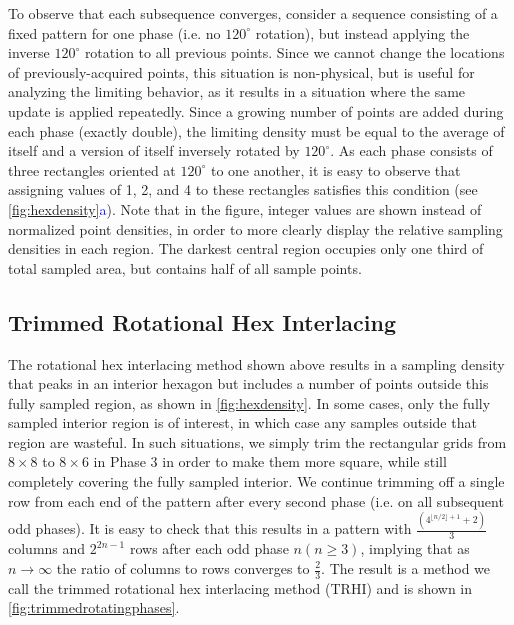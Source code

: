 \documentclass[aip, amsmath, amssymb, nobibnotes, nofootinbib, citeautoscript, reprint, superscriptaddress]{revtex4-2}
\newcommand*{\blu}{\textcolor{blue}}
\begin{document}
    To observe that each subsequence converges, consider a sequence consisting of a fixed pattern for one phase (i.e. no $120^{\circ}$ rotation), but instead applying the inverse $120^{\circ}$ rotation to all previous points.
    Since we cannot change the locations of previously-acquired points, this situation is non-physical, but is useful for analyzing the limiting behavior, as it results in a situation where the same update is applied repeatedly.
    Since a growing number of points are added during each phase (exactly double), the limiting density must be equal to the average of itself and a version of itself inversely rotated by $120^{\circ}$.
    As each phase consists of three rectangles oriented at $120^{\circ}$ to one another, it is easy to observe that assigning values of 1, 2, and 4 to these rectangles satisfies this condition (see \autoref{fig:hexdensity}\blu{a}).
    Note that in the figure, integer values are shown instead of normalized point densities, in order to more clearly display the relative sampling densities in each region.
    The darkest central region occupies only one third of total sampled area, but contains half of all sample points.

    \subsection{\label{ssec:trimmed}Trimmed Rotational Hex Interlacing}

    The rotational hex interlacing method shown above results in a sampling density that peaks in an interior hexagon but includes a number of points outside this fully sampled region, as shown in \autoref{fig:hexdensity}.
    In some cases, only the fully sampled interior region is of interest, in which case any samples outside that region are wasteful.
    In such situations, we simply trim the rectangular grids from $8\times 8$ to $8\times 6$ in
    Phase 3 in order to make them more square, while still completely covering the fully sampled interior.
    We continue trimming off a single row from each end of the pattern after every second phase (i.e. on all subsequent odd phases).
    It is easy to check that this results in a pattern with $\frac{\left(4^{\lfloor n/2\rfloor + 1} + 2\right)}{3}$ columns and $2^{2n - 1}$ rows after each odd phase $n\left(n\ge 3\right)$, implying that as $n\to\infty$ the
    ratio of columns to rows converges to $\frac{2}{3}$.
    The result is a method we call the trimmed rotational hex interlacing method (TRHI) and is shown in \autoref{fig:trimmedrotatingphases}.
\end{document}
